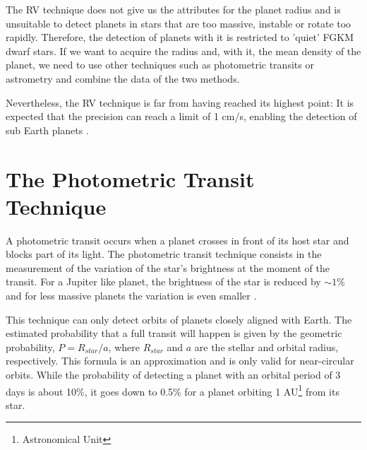 \documentclass[dvips,12pt,a4paper]{report}
\begin{document}
The RV technique does not give us the attributes for the planet radius and is unsuitable to detect planets in stars that are too massive, instable or rotate too rapidly. Therefore, the detection of planets with it is restricted to 'quiet' FGKM dwarf stars. If we want to acquire the radius and, with it, the mean density of the planet, we need to use other techniques such as photometric transits or astrometry and combine the data of the two methods.

Nevertheless, the RV technique is far from having reached its highest point: It is expected that the precision can reach a limit of 1 cm/s, enabling the detection of sub Earth planets \citep{Lovis-2006b}. 




\section{The Photometric Transit Technique}
\label{transit}
A photometric transit occurs when a planet crosses in front of its host star and blocks part of its light. 
The photometric transit technique consists in the measurement of the variation of the star's brightness at the moment of the transit. For a Jupiter like planet, the brightness of the star is reduced by $\sim 1\%$ and for less massive planets the variation is even smaller \citep{Santos-2008}. %

This technique can only detect orbits of planets closely aligned with Earth. The estimated probability that a full transit will happen is given by the geometric probability, $P=R_{star}/a$, where $R_{star}$ and $a$ are the stellar and orbital radius, respectively. This formula is an approximation and is only valid for near-circular orbits. While the probability of detecting a planet with an orbital period of 3 days is about 10\%, it goes down to 0.5\% for a planet orbiting 1 AU\footnote{Astronomical Unit} from its star.
\end{document}
